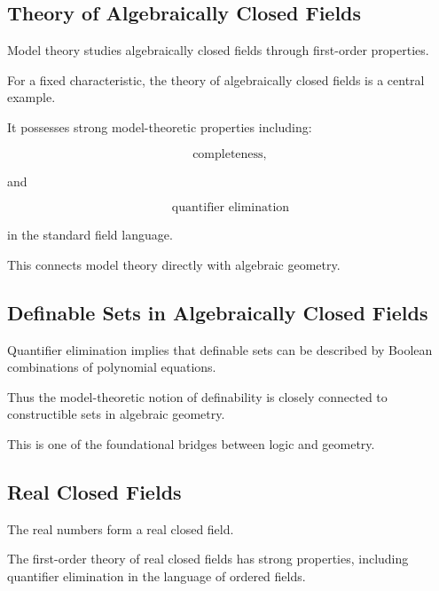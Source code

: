 \subsection{Theory of Algebraically Closed Fields}
\label{subsec:algebraically-closed-fields-model-theory}

Model theory studies algebraically closed fields through first-order
properties.

For a fixed characteristic, the theory of algebraically closed fields is a
central example.

It possesses strong model-theoretic properties including:

\[
\boxed{
\text{completeness},
}
\]

and

\[
\boxed{
\text{quantifier elimination}
}
\]

in the standard field language.

This connects model theory directly with algebraic geometry.

\subsection{Definable Sets in Algebraically Closed Fields}
\label{subsec:definable-sets-acf}

Quantifier elimination implies that definable sets can be described by
Boolean combinations of polynomial equations.

Thus the model-theoretic notion of definability is closely connected to
constructible sets in algebraic geometry.

This is one of the foundational bridges between logic and geometry.

\subsection{Real Closed Fields}
\label{subsec:real-closed-fields-model-theory}

The real numbers form a real closed field.

The first-order theory of real closed fields has strong properties,
including quantifier elimination in the language of ordered fields.

